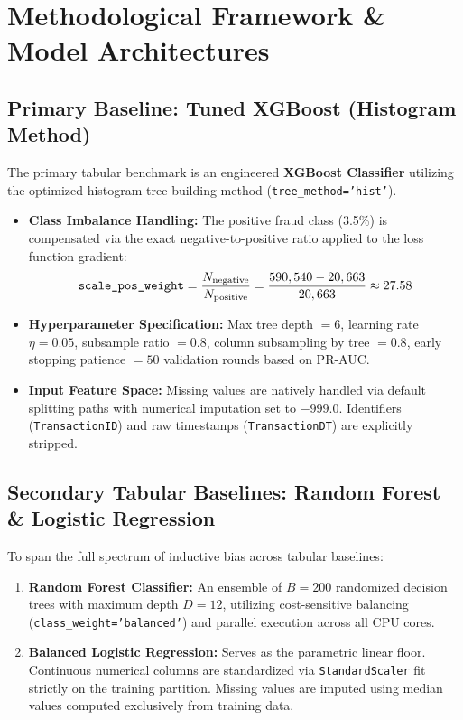\documentclass[11pt,a4paper]{article}
\begin{document}
\section{Methodological Framework \& Model Architectures}

\subsection{Primary Baseline: Tuned XGBoost (Histogram Method)}
The primary tabular benchmark is an engineered \textbf{XGBoost Classifier} \cite{chen2016xgboost} utilizing the optimized histogram tree-building method (\texttt{tree\_method='hist'}). 
\begin{itemize}[leftmargin=*]
    \item \textbf{Class Imbalance Handling:} The positive fraud class (3.5\%) is compensated via the exact negative-to-positive ratio applied to the loss function gradient:
    \begin{equation}
    \text{\texttt{scale\_pos\_weight}} = \frac{N_{\text{negative}}}{N_{\text{positive}}} = \frac{590,540 - 20,663}{20,663} \approx 27.58
    \end{equation}
    \item \textbf{Hyperparameter Specification:} Max tree depth $= 6$, learning rate $\eta = 0.05$, subsample ratio $= 0.8$, column subsampling by tree $= 0.8$, early stopping patience $= 50$ validation rounds based on PR-AUC.
    \item \textbf{Input Feature Space:} Missing values are natively handled via default splitting paths with numerical imputation set to $-999.0$. Identifiers (\texttt{TransactionID}) and raw timestamps (\texttt{TransactionDT}) are explicitly stripped.
\end{itemize}

\subsection{Secondary Tabular Baselines: Random Forest \& Logistic Regression}
To span the full spectrum of inductive bias across tabular baselines:
\begin{enumerate}[leftmargin=*]
    \item \textbf{Random Forest Classifier:} An ensemble of $B = 200$ randomized decision trees with maximum depth $D = 12$, utilizing cost-sensitive balancing (\texttt{class\_weight='balanced'}) and parallel execution across all CPU cores.
    \item \textbf{Balanced Logistic Regression:} Serves as the parametric linear floor. Continuous numerical columns are standardized via \texttt{StandardScaler} fit strictly on the training partition. Missing values are imputed using median values computed exclusively from training data.
\end{enumerate}
\end{document}
